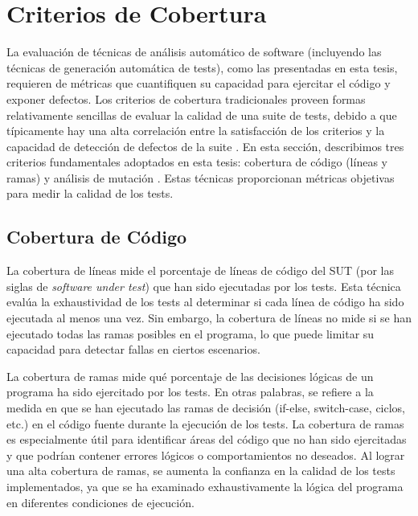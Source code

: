 



\section{Criterios de Cobertura}
\label{sec:coverage}
La evaluación de técnicas de análisis automático de software (incluyendo las
técnicas de generación automática de tests), como las presentadas en esta tesis, requieren de métricas que cuantifiquen su capacidad para ejercitar el código y exponer defectos. 
Los criterios de cobertura tradicionales proveen formas relativamente sencillas de evaluar 
la calidad de una suite de tests, debido a que típicamente hay una alta correlación entre
la satisfacción de los criterios y la capacidad de detección de defectos de la
suite \cite{} .
En esta sección, describimos tres criterios fundamentales adoptados en esta tesis: 
cobertura de código (líneas y ramas)\cite{}  y análisis de mutación 
\cite{} .
Estas técnicas proporcionan métricas objetivas para medir la calidad de los
tests.

\subsection{Cobertura de Código}

La cobertura de líneas mide el porcentaje de
líneas de código del SUT (por las siglas de \emph{software under test}) que han sido ejecutadas por los tests. 
Esta técnica evalúa la exhaustividad de los tests al determinar si cada línea de código ha sido ejecutada al menos una vez. 
Sin embargo, la cobertura de líneas no mide si se han ejecutado todas las ramas
posibles en el programa, lo que puede limitar su capacidad para detectar fallas
en ciertos escenarios.

La cobertura de ramas mide qué porcentaje de las
decisiones lógicas de un programa ha sido ejercitado por los tests. En otras
palabras, se refiere a la medida en que se han ejecutado las ramas de decisión
(if-else, switch-case, ciclos, etc.) en el código fuente durante la ejecución de
los tests. La cobertura de ramas es especialmente útil para identificar áreas del 
código que no han sido ejercitadas y que podrían contener errores lógicos o comportamientos no deseados.
Al lograr una alta cobertura de ramas, se aumenta la confianza en la calidad de
los tests implementados, ya que se ha examinado exhaustivamente la lógica del programa 
en diferentes condiciones de ejecución.

